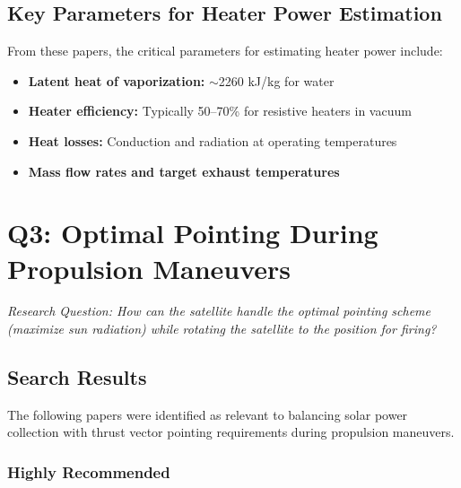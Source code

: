 \documentclass[11pt]{article}
\begin{document}
\subsection{Key Parameters for Heater Power Estimation}
From these papers, the critical parameters for estimating heater power include:
\begin{itemize}
    \item \textbf{Latent heat of vaporization:} $\sim$2260 kJ/kg for water
    \item \textbf{Heater efficiency:} Typically 50--70\% for resistive heaters in vacuum
    \item \textbf{Heat losses:} Conduction and radiation at operating temperatures
    \item \textbf{Mass flow rates and target exhaust temperatures}
\end{itemize}

\section{Q3: Optimal Pointing During Propulsion Maneuvers}
\label{sec:pointing}

\textit{Research Question: How can the satellite handle the optimal pointing scheme (maximize sun radiation) while rotating the satellite to the position for firing?}

\subsection{Search Results}
The following papers were identified as relevant to balancing solar power collection with thrust vector pointing requirements during propulsion maneuvers.

\subsubsection{Highly Recommended}
\end{document}
